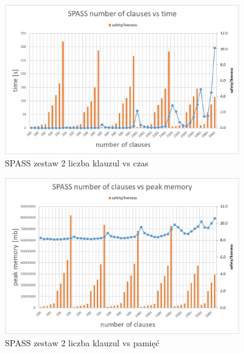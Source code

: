\documentclass[a4paper,12pt]{article}
\begin{document}
\begin{figure}[H]
  \centerline{\includegraphics[width=0.9\textwidth]{outputs/set2/set2 charts/11 SPASS number of clauses vs time.jpg}}
  \caption{SPASS zestaw 2 liczba klauzul vs czas}
\end{figure}

\begin{figure}[H]
  \centerline{\includegraphics[width=0.9\textwidth]{outputs/set2/set2 charts/12 SPASS number of clauses vs peak memory.jpg}}
  \caption{SPASS zestaw 2 liczba klauzul vs pamięć}
\end{figure}

\printglossary
\end{document}

